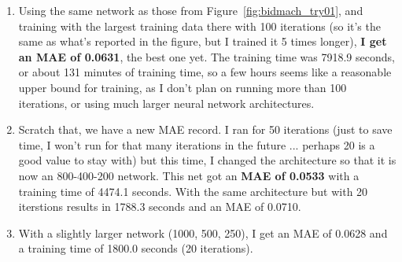 \documentclass[a4paper, 11pt]{article}
\begin{document}
\begin{enumerate}
    \item Using the same network as those from Figure~\ref{fig:bidmach_try01}, and training with the
    largest training data there with 100 iterations (so it's the same as what's reported in the
    figure, but I trained it 5 times longer), \textbf{I get an MAE of 0.0631}, the best one yet. The
    training time was 7918.9 seconds, or about 131 minutes of training time, so a few hours seems
    like a reasonable upper bound for training, as I don't plan on running more than 100 iterations,
    or using much larger neural network architectures.

    \item Scratch that, we have a new MAE record. I ran for 50 iterations (just to save time, I
    won't run for that many iterations in the future ... perhaps 20 is a good value to stay with)
    but this time, I changed the architecture so that it is now an 800-400-200 network. This net got
    an \textbf{MAE of 0.0533} with a training time of 4474.1 seconds. With the same architecture but
    with 20 iterstions results in 1788.3 seconds and an MAE of 0.0710.

    \item With a slightly larger network (1000, 500, 250), I get an MAE of 0.0628 and a training
    time of 1800.0 seconds (20 iterations).
\end{enumerate}
\end{document}
